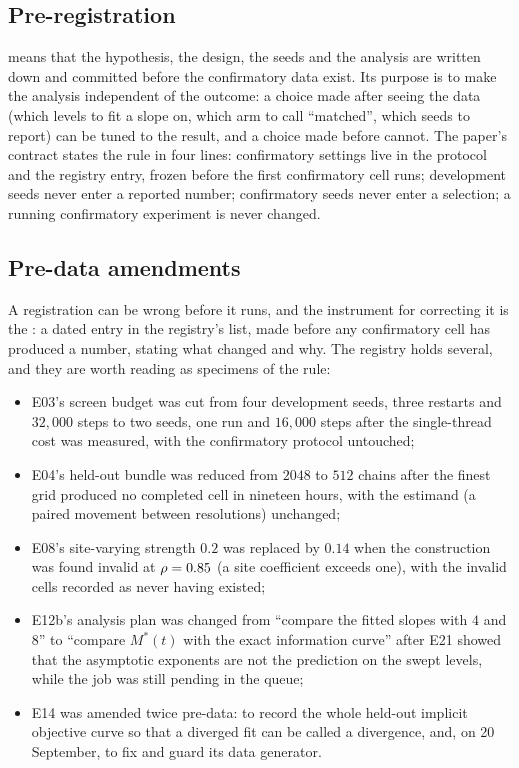 \subsection{Pre-registration}

 means that the hypothesis, the design, the seeds and the analysis
are written down and committed before the confirmatory data exist. Its purpose is to
make the analysis independent of the outcome: a choice made after seeing the data (which
levels to fit a slope on, which arm to call ``matched'', which seeds to report) can be
tuned to the result, and a choice made before cannot. The paper's contract states the
rule in four lines: confirmatory settings live in the protocol and the registry entry,
frozen before the first confirmatory cell runs; development seeds never enter a
reported number; confirmatory seeds never enter a selection; a running confirmatory
experiment is never changed.

\subsection{Pre-data amendments}
\label{sec:amendments}

A registration can be wrong before it runs, and the instrument for correcting it is the
: a dated entry in the registry's  list, made
before any confirmatory cell has produced a number, stating what changed and why. The
registry holds several, and they are worth reading as specimens of the rule:
\begin{itemize}
\item E03's screen budget was cut from four development seeds, three restarts and
  $32{,}000$ steps to two seeds, one run and $16{,}000$ steps after the single-thread cost
  was measured, with the confirmatory protocol untouched;
\item E04's held-out bundle was reduced from $2048$ to $512$ chains after the finest grid
  produced no completed cell in nineteen hours, with the estimand (a paired movement
  between resolutions) unchanged;
\item E08's site-varying strength $0.2$ was replaced by $0.14$ when the construction was
  found invalid at $\rho=0.85$ (a site coefficient exceeds one), with the invalid cells
  recorded as never having existed;
\item E12b's analysis plan was changed from ``compare the fitted slopes with $4$ and $8$''
  to ``compare $M^\ast(t)$ with the exact information curve'' after E21 showed that the
  asymptotic exponents are not the prediction on the swept levels, while the job was
  still pending in the queue;
\item E14 was amended twice pre-data: to record the whole held-out implicit objective
  curve so that a diverged fit can be called a divergence, and, on 20 September, to fix
  and guard its data generator.
\end{itemize}

